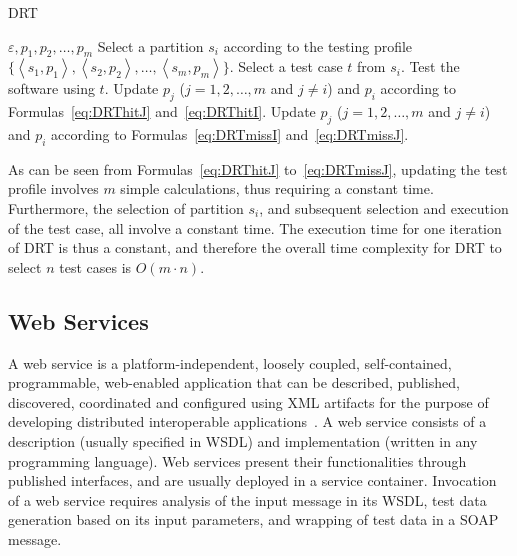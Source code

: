 \documentclass[10pt,journal,compsoc]{IEEEtran}
\begin{document}
\begin{algorithm}
    \caption{DRT}
    \label{alg:DRT}
    \begin{algorithmic}[1]
        \renewcommand{\algorithmicrequire}{\textbf{Input:}} %
	    \renewcommand{\algorithmicensure}{\textbf{Output:}}
        \renewcommand{\algorithmicendwhile}{\algorithmicend\_\algorithmicwhile}
		\renewcommand{\algorithmicendfor}{\algorithmicend\_\algorithmicfor}
		\renewcommand{\algorithmicendif}{\algorithmicend\_\algorithmicif}
		\renewcommand{\algorithmicthen}{}
		\renewcommand{\algorithmicdo}{}
        \REQUIRE $\varepsilon, p_1, p_2, \ldots, p_m$
        \STATE Select a partition $s_i$ according to the testing profile $\{ \left \langle s_1,p_1 \right \rangle, \left \langle s_2,p_2 \right \rangle, \ldots, \left \langle s_m,p_m \right \rangle\}$.
        \STATE Select a test case $t$ from $s_i$.
        \STATE Test the software using $t$.
        \STATE Update $p_j$ ($j = 1, 2, \ldots, m$ and $j \neq i$) and $p_i$ according to Formulas~\ref{eq:DRThitJ} and~\ref{eq:DRThitI}.
        \ELSE
        \STATE Update $p_j$ ($j = 1, 2, \ldots, m$ and $j \neq i$) and $p_i$ according to Formulas~\ref{eq:DRTmissI} and~\ref{eq:DRTmissJ}.
        \ENDIF
        \ENDWHILE
    \end{algorithmic}
\end{algorithm}

As can be seen from Formulas~\ref{eq:DRThitJ} to~\ref{eq:DRTmissJ},  updating the test profile involves $m$ simple calculations, thus requiring a constant time.
Furthermore, the selection of partition $s_i$, and subsequent selection and execution of the test case, all involve a constant time.
The execution time for one iteration of DRT is thus a constant, and therefore the overall time complexity for DRT to select $n$ test cases is $O(m \cdot n)$.

\subsection{Web Services}
\label{sec:webservices}

A web service is a platform-independent, loosely coupled, self-contained, programmable, web-enabled application that can be described, published, discovered, coordinated and configured using XML artifacts for the purpose of developing distributed interoperable applications~\cite{papazoglou2008service}.
A web service consists of a description (usually specified in WSDL) and implementation (written in any programming language).
Web services present their functionalities through published interfaces, and are usually deployed in a service container.
Invocation of a web service requires analysis of the input message in its WSDL, test data generation based on its input parameters, and wrapping of test data in a SOAP message.
\end{document}
